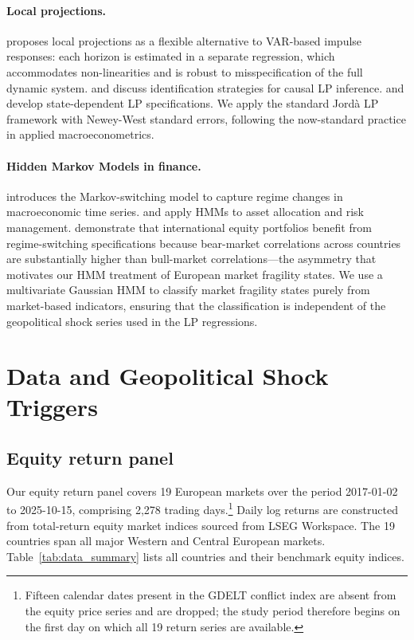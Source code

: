 \documentclass[11pt]{article}
\begin{document}
\paragraph{Local projections.}
\citet{jorda2005} proposes local projections as a flexible alternative to
VAR-based impulse responses: each horizon is estimated in a separate
regression, which accommodates non-linearities and is robust to
misspecification of the full dynamic system.
\citet{romer2004new} and \citet{stock2018} discuss identification
strategies for causal LP inference.
\citet{jordan2020state} and \citet{auerbach2012fiscal} develop state-dependent
LP specifications.
We apply the standard Jord\`a LP framework with Newey-West standard errors,
following the now-standard practice in applied macroeconometrics.

\paragraph{Hidden Markov Models in finance.}
\citet{hamilton1989new} introduces the Markov-switching model to capture
regime changes in macroeconomic time series.
\citet{guidolin2007asset} and \citet{ang2012regime} apply HMMs to asset
allocation and risk management.
\citet{angbekaert2002} demonstrate that international equity portfolios
benefit from regime-switching specifications because bear-market correlations
across countries are substantially higher than bull-market correlations---the
asymmetry that motivates our HMM treatment of European market fragility states.
We use a multivariate Gaussian HMM to classify market fragility states
purely from market-based indicators, ensuring that the classification is
independent of the geopolitical shock series used in the LP regressions.

\section{Data and Geopolitical Shock Triggers}
\label{sec:data}

\subsection{Equity return panel}
\label{subsec:equity}

Our equity return panel covers 19 European markets over the period
2017-01-02 to 2025-10-15, comprising 2,278 trading days.\footnote{
  Fifteen calendar dates present in the GDELT conflict index are absent from
  the equity price series and are dropped; the study period therefore begins
  on the first day on which all 19 return series are available.}
Daily log returns are constructed from total-return equity market indices
sourced from LSEG Workspace.
The 19 countries span all major Western and Central European markets.
Table~\ref{tab:data_summary} lists all countries and their benchmark equity indices.
\end{document}
